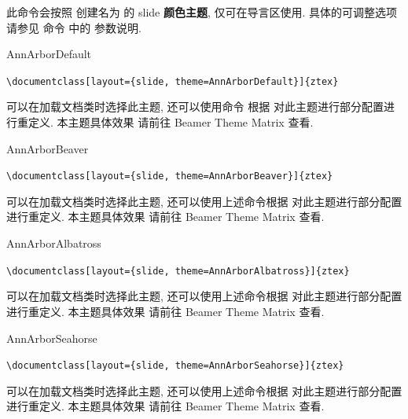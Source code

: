 \begin{function}[updated=2025-04-25]{\zslidethemenew}
  \begin{syntax}
  \end{syntax}
  此命令会按照  创建名为  的 slide \textbf{颜色主题}, 仅可在导言区使用. 具体的可调整选项请参见
  命令 \cmd{\zslideset} 中的  参数说明.  
\end{function}


\begin{function}[updated=2024-11-05]{AnnArborDefault}
  \begin{syntax}
    \verb!\documentclass[layout={slide, theme=AnnArborDefault}]{ztex}!
  \end{syntax}  
  可以在加载文档类时选择此主题, 还可以使用命令  根据  对此主题进行部分配置进行重定义. 本主题具体效果
  请前往 Beamer Theme Matrix 查看.
\end{function}


\begin{function}[updated=2024-11-05]{AnnArborBeaver}
  \begin{syntax}
    \verb!\documentclass[layout={slide, theme=AnnArborBeaver}]{ztex}!
  \end{syntax}  
  可以在加载文档类时选择此主题, 还可以使用上述命令根据  对此主题进行部分配置进行重定义. 本主题具体效果
  请前往 Beamer Theme Matrix 查看.
\end{function}

\begin{function}[updated=2024-11-05]{AnnArborAlbatross}
  \begin{syntax}
    \verb!\documentclass[layout={slide, theme=AnnArborAlbatross}]{ztex}!
  \end{syntax}  
  可以在加载文档类时选择此主题, 还可以使用上述命令根据  对此主题进行部分配置进行重定义. 本主题具体效果
  请前往 Beamer Theme Matrix 查看.
\end{function}

\begin{function}[updated=2024-11-05]{AnnArborSeahorse}
  \begin{syntax}
    \verb!\documentclass[layout={slide, theme=AnnArborSeahorse}]{ztex}!
  \end{syntax}  
  可以在加载文档类时选择此主题, 还可以使用上述命令根据  对此主题进行部分配置进行重定义. 本主题具体效果
  请前往 Beamer Theme Matrix 查看.
\end{function}


